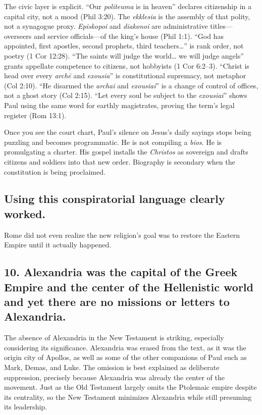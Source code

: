 The civic layer is explicit.
“Our \emph{politeuma} is in heaven” declares citizenship in a capital city, not a mood (Phil 3:20).
The \emph{ekklesia} is the assembly of that polity, not a synagogue proxy.
\emph{Episkopoi} and \emph{diakonoi} are administrative titles—overseers and service officials—of the king’s house (Phil 1:1).
“God has appointed, first apostles, second prophets, third teachers…” is rank order, not poetry (1 Cor 12:28).
“The saints will judge the world… we will judge angels” grants appellate competence to citizens, not hobbyists (1 Cor 6:2–3).
“Christ is head over every \emph{archē} and \emph{exousia}” is constitutional supremacy, not metaphor (Col 2:10).
“He disarmed the \emph{archai} and \emph{exousiai}” is a change of control of offices, not a ghost story (Col 2:15).
“Let every soul be subject to the \emph{exousiai}” shows Paul using the same word for earthly magistrates, proving the term’s legal register (Rom 13:1).

Once you see the court chart, Paul’s silence on Jesus’s daily sayings stops being puzzling and becomes programmatic.
He is not compiling a \emph{bios}.
He is promulgating a charter.
His gospel installs the \emph{Christos} as sovereign and drafts citizens and soldiers into that new order.
Biography is secondary when the constitution is being proclaimed.

\subsection{Using this conspiratorial language clearly worked.}\label{subsec:using-this-conspiratorial-language-clearly-worked}

Rome did not even realize the new religion's goal was to restore the Eastern Empire until it actually happened.

\subsection{10.
Alexandria was the capital of the Greek Empire and the center of the Hellenistic world and yet there are no missions or letters to Alexandria.}\label{subsec:alexandria-was-the-capital-of-the-greek-empire-and-the-center-of-the-hellenistic-world-and-yet-there-are-no-missions-or-letters-to-alexandria.}

The absence of Alexandria in the New Testament is striking, especially considering its significance.
Alexandria was erased from the text, as it was the origin city of Apollos, as well as some of the other companions of Paul such as Mark, Demas, and Luke.
The omission is best explained as deliberate suppression, precisely because Alexandria was already the center of the movement.
Just as the Old Testament largely omits the Ptolemaic empire despite its centrality, so the New Testament minimizes Alexandria while still presuming its leadership.

